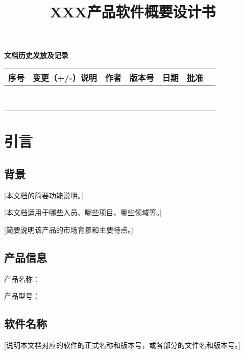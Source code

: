 \documentclass[12pt,a4paper,UTF-8]{ctexart}
\begin{document}
\centering
\textbf{文档历史发放及记录}
\quad
\begin{table}[h]
	\begin{center} %
		\begin{tabular}{|C{1.6cm}|C{5cm}|c|c|c|c|c|}%
		\hline
		\textbf{序号} &\textbf{     变更（+/-）说明      }&\textbf{   作者   }&\textbf{版本号}&\textbf{  日期  }&\textbf{  批准  }\\
		\hline
		 & & & & & \\
		\hline
		 & & & & & \\
		\hline
		 & & & & & \\
		\hline
		 & & & & & \\
		\hline
		 & & & & & \\
		\hline
		 & & & & & \\
		\hline
		 & & & & & \\
		\hline
		 & & & & & \\
		\hline
		\end{tabular}
	\end{center}
\end{table}


\newpage

\title{XXX产品软件概要设计书}
\date{}

\maketitle  %
\clearpage
\tableofcontents  %
\section{引言}
    \subsection{背景}
    [本文档的简要功能说明。]

	[本文档适用于哪些人员、哪些项目、哪些领域等。]

	[简要说明该产品的市场背景和主要特点。]
	\subsection{产品信息}
		产品名称：
		
		产品型号：
	\subsection{软件名称}
		[说明本文档对应的软件的正式名称和版本号，或各部分的文件名和版本号。]
\end{document}
